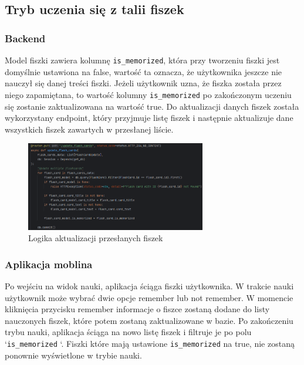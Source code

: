 \subsection{Tryb uczenia się z talii fiszek}

\subsubsection{Backend}

Model fiszki zawiera kolumnę \texttt{is_memorized}, która przy tworzeniu fiszki jest domyślnie ustawiona na false, wartość ta oznacza, że użytkownika jeszcze nie nauczył się danej treści fiszki. Jeżeli użytkownik uzna, że fiszka została przez niego zapamiętana, to wartość kolumny \texttt{is_memorized} po zakończonym uczeniu się zostanie zaktualizowana na wartość true. Do aktualizacji danych fiszek została wykorzystany endpoint, który przyjmuje listę fiszek i następnie aktualizuje dane wszystkich fiszek zawartych w przesłanej liście.

\begin{figure}[H]
    \centering
    \includegraphics[width=0.7\textwidth]{chapters/chapter_8/screens/update_flash_card_memorized_backend}
    \caption{Logika aktualizacji przesłanych fiszek}
    \label{img:update_flash_card_memorized_backend}
\end{figure}

\subsubsection{Aplikacja moblina}

Po wejściu na widok nauki, aplikacja ściąga fiszki użytkownika. W trakcie nauki użytkownik może wybrać dwie opcje remember lub not remember. W momencie kliknięcia przycisku remember informacje o fiszce zostaną dodane do listy nauczonych fiszek, które potem zostaną zaktualizowane w bazie. Po zakończeniu trybu nauki, aplikacja ściąga na nowo listę fiszek i filtruje je po polu ‘\texttt{is_memorized} ‘. Fiszki które mają ustawione \texttt{is_memorized} na true, nie zostaną ponownie wyświetlone w trybie nauki.

